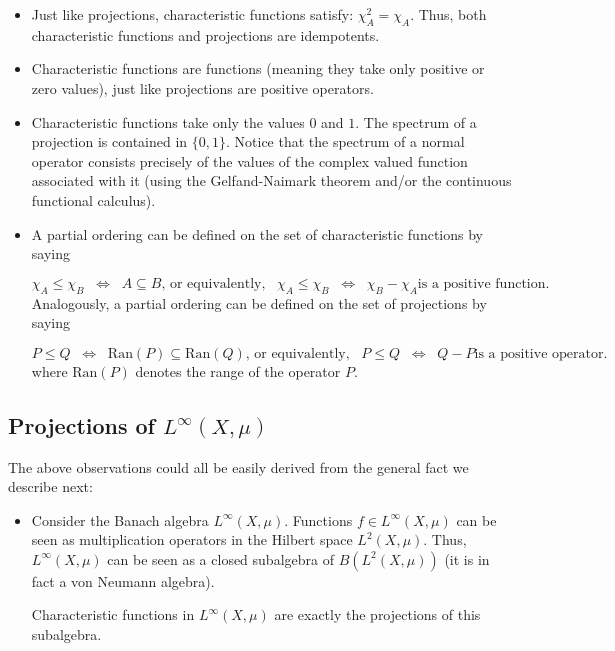 \documentclass[12pt]{article}
\begin{document}
\begin{itemize}
\item Just like projections, characteristic functions satisfy: $\chi_A^2=\chi_A$. Thus, both characteristic functions and projections are idempotents.
\end{itemize}
\begin{itemize}
\item Characteristic functions are  functions (meaning they take only positive or zero values), just like projections are positive operators.
\end{itemize}
\begin{itemize}
\item Characteristic functions take only the values $0$ and $1$. The spectrum of a projection is contained in $\{0,1\}$. Notice that the spectrum of a normal operator consists precisely of the values of the complex valued function associated with it (using the Gelfand-Naimark theorem and/or the continuous functional calculus).
\end{itemize}
\begin{itemize}
\item A partial ordering can be defined on the set of characteristic functions by saying

\begin{displaymath}
\chi_A \leq \chi_B \;\;\Longleftrightarrow\;\; A \subseteq B \text{, or equivalently,}\;\;\; \chi_A \leq \chi_B \;\;\Longleftrightarrow\;\; \chi_B- \chi_A \text{is a positive function}.
\end{displaymath}
Analogously, a partial ordering can be defined on the set of projections by saying

\begin{displaymath}
P \leq Q \;\;\Longleftrightarrow\;\; \mathrm{Ran}(P) \subseteq \mathrm{Ran}(Q) \text{, or equivalently,}\;\;\; P \leq Q \;\;\Longleftrightarrow\;\; Q- P \text{is a positive operator}.
\end{displaymath}
where $\mathrm{Ran}(P)$ denotes the range of the operator $P$.
\end{itemize}

\subsection{Projections of $L^{\infty}(X, \mu)$}

The above observations could all be easily derived from the general fact we describe next:
\begin{itemize}
\item Consider the Banach algebra $L^{\infty}(X, \mu)$. Functions $f \in L^{\infty}(X, \mu)$ can be seen as multiplication operators in the Hilbert space $L^2(X, \mu)$. Thus, $L^{\infty}(X, \mu)$ can be seen as a closed subalgebra of $B(L^2(X, \mu))$ (it is in fact a von Neumann algebra).

Characteristic functions in $L^{\infty}(X, \mu)$ are exactly the projections of this subalgebra.
\end{itemize}
\end{document}
